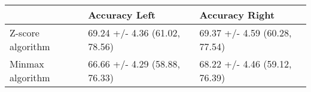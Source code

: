 \begin{tabular}{lll}
\toprule
{} &                  Accuracy Left &                 Accuracy Right \\
\midrule
Z-score algorithm &  69.24 +/- 4.36 (61.02, 78.56) &  69.37 +/- 4.59 (60.28, 77.54) \\
Minmax algorithm  &  66.66 +/- 4.29 (58.88, 76.33) &  68.22 +/- 4.46 (59.12, 76.39) \\
\bottomrule
\end{tabular}
